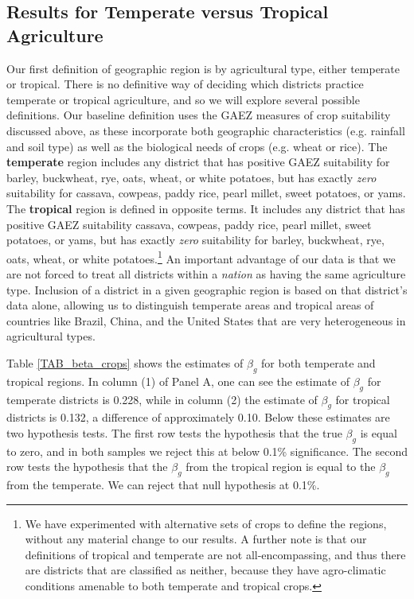 \documentclass[11pt]{article}
\begin{document}
\subsection{Results for Temperate versus Tropical Agriculture}
Our first definition of geographic region is by agricultural type, either temperate or tropical. There is no definitive way of deciding which districts practice temperate or tropical agriculture, and so we will explore several possible definitions. Our baseline definition uses the GAEZ measures of crop suitability discussed above, as these incorporate both geographic characteristics (e.g. rainfall and soil type) as well as the biological needs of crops (e.g. wheat or rice). The \textbf{temperate} region includes any district that has positive GAEZ suitability for barley, buckwheat, rye, oats, wheat, or white potatoes, but has exactly \textit{zero} suitability for cassava, cowpeas, paddy rice, pearl millet, sweet potatoes, or yams. The \textbf{tropical} region is defined in opposite terms. It includes any district that has positive GAEZ suitability cassava, cowpeas, paddy rice, pearl millet, sweet potatoes, or yams, but has exactly \textit{zero} suitability for barley, buckwheat, rye, oats, wheat, or white potatoes.\footnote{We have experimented with alternative sets of crops to define the regions, without any material change to our results. A further note is that our definitions of tropical and temperate are not all-encompassing, and thus there are districts that are classified as neither, because they have agro-climatic conditions amenable to both temperate and tropical crops.} An important advantage of our data is that we are not forced to treat all districts within a \textit{nation} as having the same agriculture type. Inclusion of a district in a given geographic region is based on that district's data alone, allowing us to distinguish temperate areas and tropical areas of countries like Brazil, China, and the United States that are very heterogeneous in agricultural types.

Table \ref{TAB_beta_crops} shows the estimates of $\beta_g$ for both temperate and tropical regions. In column (1) of Panel A, one can see the estimate of $\beta_g$ for temperate districts is 0.228, while in column (2) the estimate of $\beta_g$ for tropical districts is 0.132, a difference of approximately 0.10. Below these estimates are two hypothesis tests. The first row tests the hypothesis that the true $\beta_g$ is equal to zero, and in both samples we reject this at below 0.1\% significance. The second row tests the hypothesis that the $\beta_g$ from the tropical region is equal to the $\beta_g$ from the temperate. We can reject that null hypothesis at 0.1\%.
\end{document}
